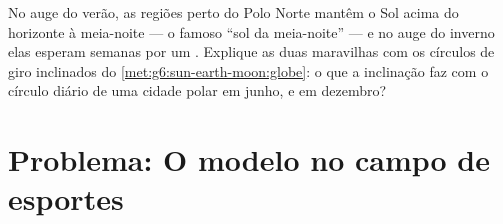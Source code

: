\begin{exercise}[$\star\star\star$]\label{exo:g6:sun-earth-moon:12}
No auge do verão, as regiões perto do Polo Norte mantêm o Sol acima
do horizonte à meia-noite --- o famoso ``sol da meia-noite'' --- e no
auge do inverno elas esperam semanas por um . Explique
as duas maravilhas com os círculos de giro inclinados do
\cref{met:g6:sun-earth-moon:globe}: o que a inclinação faz com o
círculo diário de uma cidade polar em junho, e em dezembro?
\end{exercise}

\section{Problema: O modelo no campo de esportes}


